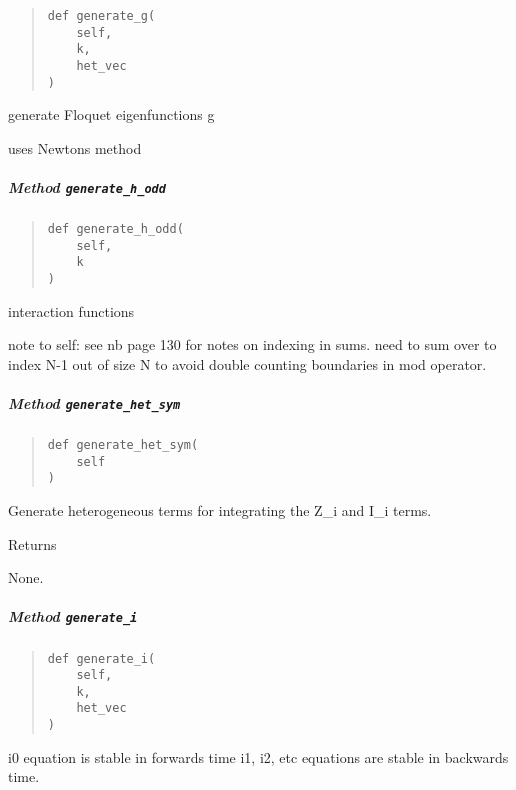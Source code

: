 \documentclass[english,a4paper,oneside]{article}
\let\oldsubparagraph\subparagraph
\renewcommand{\subparagraph}[1]{\oldsubparagraph{#1}\mbox{}}
\begin{document}
\begin{quote}
\begin{verbatim}
def generate_g(
    self,
    k,
    het_vec
)
\end{verbatim}
\end{quote}

generate Floquet eigenfunctions g

uses Newtons method

\hypertarget{StrongCoupling.StrongCoupling.generate_h_odd}{%
\subparagraph{\texorpdfstring{Method
\texttt{generate\_h\_odd}}{Method generate\_h\_odd}}\label{StrongCoupling.StrongCoupling.generate_h_odd}}

\begin{quote}
\begin{verbatim}
def generate_h_odd(
    self,
    k
)
\end{verbatim}
\end{quote}

interaction functions

note to self: see nb page 130 for notes on indexing in sums. need to sum
over to index N-1 out of size N to avoid double counting boundaries in
mod operator.

\hypertarget{StrongCoupling.StrongCoupling.generate_het_sym}{%
\subparagraph{\texorpdfstring{Method
\texttt{generate\_het\_sym}}{Method generate\_het\_sym}}\label{StrongCoupling.StrongCoupling.generate_het_sym}}

\begin{quote}
\begin{verbatim}
def generate_het_sym(
    self
)
\end{verbatim}
\end{quote}

Generate heterogeneous terms for integrating the Z\_i and I\_i terms.

Returns

None.

\hypertarget{StrongCoupling.StrongCoupling.generate_i}{%
\subparagraph{\texorpdfstring{Method
\texttt{generate\_i}}{Method generate\_i}}\label{StrongCoupling.StrongCoupling.generate_i}}

\begin{quote}
\begin{verbatim}
def generate_i(
    self,
    k,
    het_vec
)
\end{verbatim}
\end{quote}

i0 equation is stable in forwards time i1, i2, etc equations are stable
in backwards time.
\end{document}
